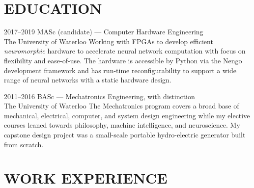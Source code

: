 \documentclass[a4paper,nocolors]{cv-friggeri-ben}
\begin{document}

\section{EDUCATION}

\begin{entrylist}

\entry
    {2017--2019}
    {MASc {\normalfont (candidate) --- Computer Hardware Engineering}}
    {\\The University of Waterloo}
    {Working with FPGAs to develop efficient \textit{neuromorphic} hardware to accelerate neural network computation with focus on flexibility and ease-of-use. The hardware is accessible by Python via the Nengo development framework and has run-time reconfigurability to support a wide range of neural networks with a static hardware design.}

\entry
    {2011--2016}
    {BASc {\normalfont --- Mechatronics Engineering, with distinction}}
    {\\The University of Waterloo}
    {The Mechatronics program covers a broad base of mechanical, electrical, computer, and system design engineering while my elective courses leaned towards philosophy, machine intelligence, and neuroscience. My capstone design project was a small-scale portable hydro-electric generator built from scratch.}

\end{entrylist}


\section{WORK EXPERIENCE}
\end{document}
